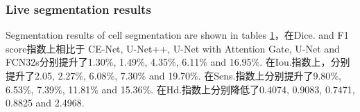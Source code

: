 \documentclass{ieeeaccess}
\begin{document}
\subsubsection{Live segmentation results}
Segmentation results of cell segmentation are shown in tables \ref{dataset-table}，在Dice. and F1 score指数上相比于
CE-Net, U-Net++, U-Net with Attention Gate, U-Net and FCN32s分别提升了1.30\(\%\), 1.49\(\%\), 4.35\(\%\), 6.11\(\%\) and 16.95\(\%\).
在Iou.指数上，分别提升了2.05, 2.27\(\%\), 6.08\(\%\), 7.30\(\%\) and 19.70\(\%\). 在Sens.指数上分别提升了9.80\(\%\), 6.53\(\%\), 7.39\(\%\), 
11.81\(\%\) and 15.36\(\%\). 在Hd.指数上分别降低了0.4074, 0.9083, 0.7471, 0.8825 and 2.4968.
  \begin{table}[htbp]
    \vspace{-2mm}
    \begin{center}\small
    \label{dataset-table}
    \begin{tabular}{cccccccc}
      

\end{tabular}
\end{center}
\end{table}
\end{document}
